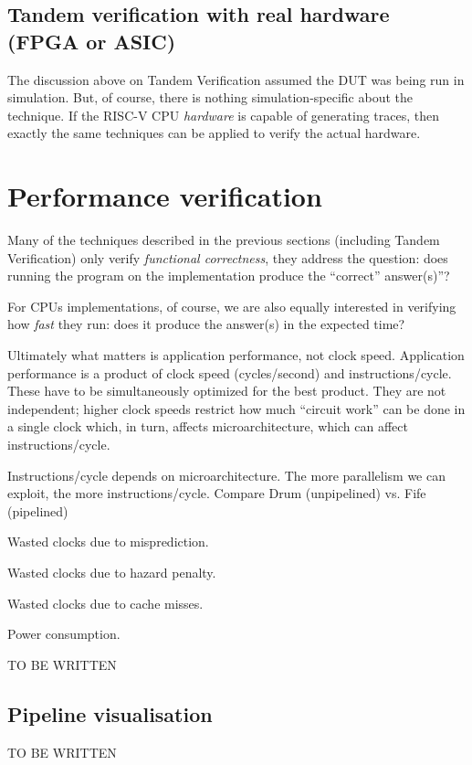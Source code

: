 
\subsection{Tandem verification with real hardware (FPGA or ASIC)}

The discussion above on Tandem Verification assumed the DUT was being
run in simulation.  But, of course, there is nothing
simulation-specific about the technique.  If the RISC-V CPU
\emph{hardware} is capable of generating traces, then exactly the same
techniques can be applied to verify the actual hardware.


\section{Performance verification}

Many of the techniques described in the previous sections (including
Tandem Verification) only verify \emph{functional correctness}, {\ie}
they address the question: does running the program on the
implementation produce the ``correct'' answer(s)''?

For CPUs implementations, of course, we are also equally interested in
verifying how \emph{fast} they run: does it produce the answer(s) in
the expected time?

Ultimately what matters is application performance, not clock speed.
Application performance is a product of clock speed (cycles/second)
and instructions/cycle.  These have to be simultaneously optimized for
the best product.  They are not independent; higher clock speeds
restrict how much ``circuit work'' can be done in a single clock
which, in turn, affects microarchitecture, which can affect
instructions/cycle.

Instructions/cycle depends on microarchitecture.  The more parallelism
we can exploit, the more instructions/cycle.  Compare Drum
(unpipelined) vs. Fife (pipelined)

Wasted clocks due to misprediction.

Wasted clocks due to hazard penalty.

Wasted clocks due to cache misses.

Power consumption.


TO BE WRITTEN


\subsection{Pipeline visualisation}

TO BE WRITTEN

